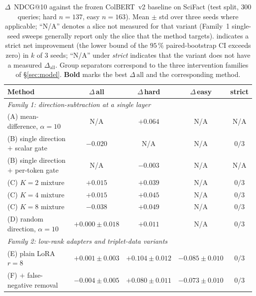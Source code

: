 \begin{table}[t]
\centering
\caption{$\Delta$~NDCG@10 against the frozen ColBERT~v2 baseline on SciFact (test split, $300$ queries; hard $n{=}137$, easy $n{=}163$). Mean $\pm$ std over three seeds where applicable; ``N/A'' denotes a slice not measured for that variant (Family~1 single-seed sweeps generally report only the slice that the method targets). \checkmark indicates a strict net improvement (the lower bound of the $95\,\%$ paired-bootstrap CI exceeds zero) in $k$ of $3$ seeds; ``N/A'' under \emph{strict} indicates that the variant does not have a measured $\Delta_{\text{all}}$. Group separators correspond to the three intervention families of \S\ref{sec:model}. \textbf{Bold} marks the best $\Delta\,\mathrm{all}$ and the corresponding method.}
\label{tab:main-results}
\footnotesize
\setlength{\tabcolsep}{3.5pt}
\begin{tabular}{lcccc}
\toprule
Method & $\Delta$\,all & $\Delta$\,hard & $\Delta$\,easy & strict \\
\midrule
\multicolumn{5}{l}{\emph{Family 1: direction-subtraction at a single layer}} \\
(A)  mean-difference, $\alpha{=}10$              & N/A            & $+0.064$ & N/A            & N/A \\
(B)  single direction $+$ scalar gate            & $-0.020$       & N/A      & N/A            & $0/3$ \\
(B)  single direction $+$ per-token gate         & N/A            & $-0.003$ & N/A            & N/A \\
(C)  $K{=}2$ mixture                             & $+0.015$       & $+0.039$ & N/A            & $0/3$ \\
(C)  $K{=}4$ mixture                             & $+0.015$       & $+0.045$ & N/A            & $0/3$ \\
(C)  $K{=}8$ mixture                             & $-0.038$       & $+0.049$ & N/A            & $0/3$ \\
(D)  random direction, $\alpha{=}10$              & $+0.000\pm 0.018$ & $+0.011$ & N/A          & $0/3$ \\
\midrule
\multicolumn{5}{l}{\emph{Family 2: low-rank adapters and triplet-data variants}} \\
(E)  plain LoRA $r{=}8$                          & $+0.001\pm 0.003$ & $+0.104\pm 0.012$ & $-0.085\pm 0.010$ & $0/3$ \\
(F)  $+$ false-negative removal                  & $-0.004\pm 0.005$ & $+0.080\pm 0.011$ & $-0.073\pm 0.010$ & $0/3$ \\

\end{tabular}
\end{table}
